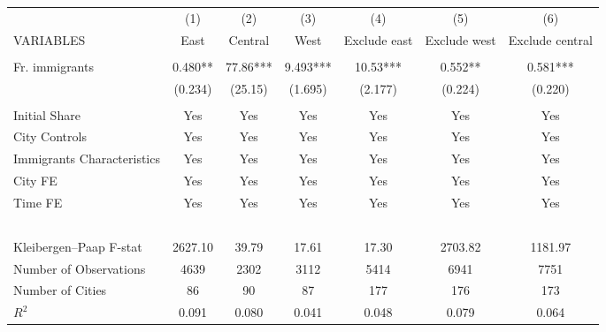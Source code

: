 \begin{tabular}{lcccccc} \hline
 & (1) & (2) & (3) & (4) & (5) & (6) \\
VARIABLES & East & Central & West & Exclude east & Exclude west & Exclude central \\ \hline
 &  &  &  &  &  &  \\
Fr. immigrants & 0.480** & 77.86*** & 9.493*** & 10.53*** & 0.552** & 0.581*** \\
 & (0.234) & (25.15) & (1.695) & (2.177) & (0.224) & (0.220) \\
 &  &  &  &  &  &  \\
Initial Share & Yes & Yes & Yes & Yes & Yes & Yes \\
City Controls & Yes & Yes & Yes & Yes & Yes & Yes \\
Immigrants Characteristics & Yes & Yes & Yes & Yes & Yes & Yes \\
City FE & Yes & Yes & Yes & Yes & Yes & Yes \\
Time FE & Yes & Yes & Yes & Yes & Yes & Yes \\
~ & ~ & ~ & ~ & ~ & ~ & ~ \\
Kleibergen–Paap F-stat & 2627.10 & 39.79 & 17.61 & 17.30 & 2703.82 & 1181.97 \\
Number of Observations & 4639 & 2302 & 3112 & 5414 & 6941 & 7751 \\
Number of Cities & 86 & 90 & 87 & 177 & 176 & 173 \\
 $ R^2$ & 0.091 & 0.080 & 0.041 & 0.048 & 0.079 & 0.064 \\ \hline
\end{tabular}
